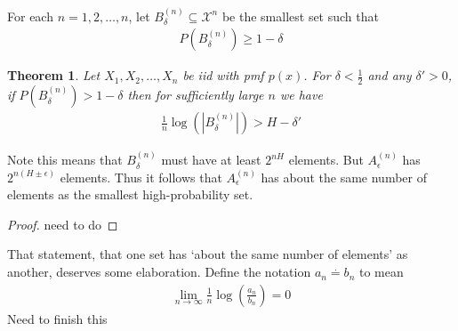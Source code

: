 \documentclass{article}
\theoremstyle{definition}
\theoremstyle{plain}
\newtheorem{theorem}{Theorem}[section]
\begin{document}
For each $n = 1,2,\ldots,n$, let $B_{\delta}^{(n)} \subseteq \mathcal{X}^n$ be the smallest set such that 
\begin{align}
	P(B_{\delta}^{(n)}) \geq 1-\delta
\end{align}
\begin{theorem}
	Let $X_1, X_2,\ldots,X_n$ be iid with pmf $p(x)$. For $\delta < \frac{1}{2}$ and any $\delta' > 0$, if $P(B_{\delta}^{(n)}) > 1-\delta$ then for sufficiently large $n$ we have 
	\begin{align}
		\frac{1}{n}\log(|B_{\delta}^{(n)}|) > H- \delta'
	\end{align}
\end{theorem}
Note this means that $B_{\delta}^{(n)}$ must have at least $2^{nH}$ elements. But $A_{\epsilon}^{(n)}$ has $2^{n(H\pm \epsilon)}$ elements. Thus it follows that $A^{(n)}_{\epsilon}$ has about the same number of elements as the smallest high-probability set.
\begin{proof}
	need to do
\end{proof}
That statement, that one set has `about the same number of elements' as another, deserves some elaboration. Define the notation $a_n \overset{.}{=} b_n$ to mean 
\begin{align}
	\lim_{n \to \infty} \frac{1}{n}\log\left(\frac{a_n}{b_n} \right) = 0
\end{align}
Need to finish this
\end{document}
